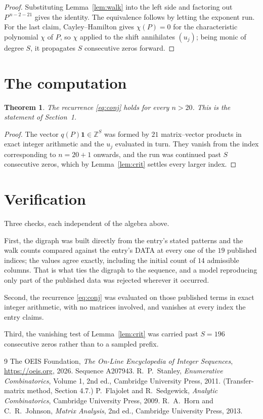 \documentclass[11pt,a4paper]{article}
\theoremstyle{plain}
\newtheorem{theorem}{Theorem}
\theoremstyle{definition}
\begin{document}
\begin{proof}
Substituting Lemma~\ref{lem:walk} into the left side and factoring out
$P^{\,n-2-21}$ gives the identity. The equivalence follows by letting the exponent
run. For the last claim, Cayley--Hamilton gives $\chi(P)=0$ for the characteristic
polynomial $\chi$ of $P$, so $\chi$ applied to the shift annihilates $(u_j)$; being monic of
degree $S$, it propagates $S$ consecutive zeros forward.
\end{proof}

\section{The computation}

\begin{theorem}
The recurrence \eqref{eq:conj} holds for every $n>20$. This is the statement of
Section~1.
\end{theorem}

\begin{proof}
The vector $q(P)\mathbf{1}\in\mathbb{Z}^{S}$ was formed by $21$ matrix--vector
products in exact integer arithmetic and the $u_j$ evaluated in turn. They vanish from the
index corresponding to $n=20+1$ onwards, and the run was continued past $S$ consecutive
zeros, which by Lemma~\ref{lem:crit} settles every larger index.
\end{proof}

\section{Verification}

Three checks, each independent of the algebra above.

First, the digraph was built directly from the entry's stated patterns and the walk counts
compared against the entry's DATA at every one of the $19$ published indices; the
values agree exactly, including the initial count of $14$ admissible columns. That is
what ties the digraph to the sequence, and a model reproducing only part of the published
data was rejected wherever it occurred.

Second, the recurrence \eqref{eq:conj} was evaluated on those published terms in exact
integer arithmetic, with no matrices involved, and vanishes at every index the entry claims.

Third, the vanishing test of Lemma~\ref{lem:crit} was carried past $S=196$ consecutive
zeros rather than to a sampled prefix.

\begin{thebibliography}{9}
 The OEIS Foundation, \emph{The On-Line Encyclopedia of Integer
Sequences}, \url{https://oeis.org}, 2026. Sequence A207943.
 R.~P.~Stanley, \emph{Enumerative Combinatorics}, Volume 1, 2nd ed.,
Cambridge University Press, 2011. (Transfer-matrix method, Section 4.7.)
 P.~Flajolet and R.~Sedgewick, \emph{Analytic Combinatorics}, Cambridge
University Press, 2009.
 R.~A.~Horn and C.~R.~Johnson, \emph{Matrix Analysis}, 2nd ed., Cambridge
University Press, 2013.
\end{thebibliography}
\end{document}
